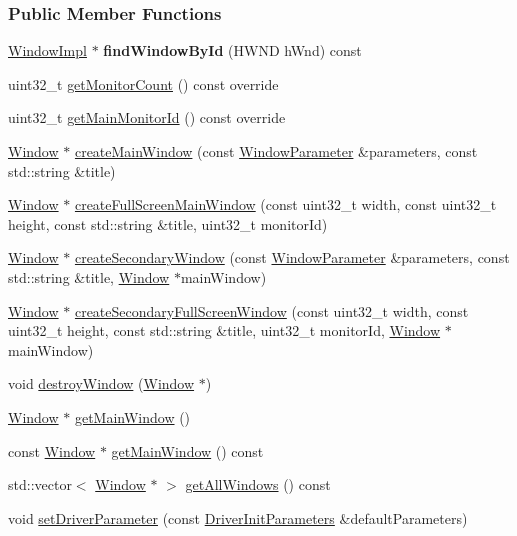 \subsubsection*{Public Member Functions}
\begin{DoxyCompactItemize}
\item 
\hyperlink{a00086}{Window\+Impl} $\ast$ {\bfseries find\+Window\+By\+Id} (H\+W\+ND h\+Wnd) const \hypertarget{a00088_a5c540372abdb0267e6a744275c0dc70c}{}\label{a00088_a5c540372abdb0267e6a744275c0dc70c}

\item 
uint32\+\_\+t \hyperlink{a00088_afa93bde2dfc7d722c236f2a2c51b45af}{get\+Monitor\+Count} () const  override
\item 
uint32\+\_\+t \hyperlink{a00088_a549d762ba32d525e574c06d8bb103255}{get\+Main\+Monitor\+Id} () const  override
\item 
\hyperlink{a00082}{Window} $\ast$ \hyperlink{a00087_a863ac648c2c2a93a57c4a898fb176718}{create\+Main\+Window} (const \hyperlink{a00091}{Window\+Parameter} \&parameters, const std\+::string \&title)
\item 
\hyperlink{a00082}{Window} $\ast$ \hyperlink{a00087_a9c2adc3003612cafb99fd7a156bc9655}{create\+Full\+Screen\+Main\+Window} (const uint32\+\_\+t width, const uint32\+\_\+t height, const std\+::string \&title, uint32\+\_\+t monitor\+Id)
\item 
\hyperlink{a00082}{Window} $\ast$ \hyperlink{a00087_afc8f953d7aa1e2822b8ced1e5b855ab8}{create\+Secondary\+Window} (const \hyperlink{a00091}{Window\+Parameter} \&parameters, const std\+::string \&title, \hyperlink{a00082}{Window} $\ast$main\+Window)
\item 
\hyperlink{a00082}{Window} $\ast$ \hyperlink{a00087_a8d3b6392e5389e7e5706f92ceed96fa0}{create\+Secondary\+Full\+Screen\+Window} (const uint32\+\_\+t width, const uint32\+\_\+t height, const std\+::string \&title, uint32\+\_\+t monitor\+Id, \hyperlink{a00082}{Window} $\ast$main\+Window)
\item 
void \hyperlink{a00087_aecfb9aa6471ecf82e5c76a96440c275c}{destroy\+Window} (\hyperlink{a00082}{Window} $\ast$)
\item 
\hyperlink{a00082}{Window} $\ast$ \hyperlink{a00087_a7ccb3265cab90117a4face1c5ebb5e29}{get\+Main\+Window} ()
\item 
const \hyperlink{a00082}{Window} $\ast$ \hyperlink{a00087_aa59c328988c32399328f8f38c5210275}{get\+Main\+Window} () const 
\item 
std\+::vector$<$ \hyperlink{a00082}{Window} $\ast$ $>$ \hyperlink{a00087_a9aac4dcdd92008cd8602b7456be6260a}{get\+All\+Windows} () const 
\item 
void \hyperlink{a00087_a9aaa765ab360c7093dd1f1d3f5f3d621}{set\+Driver\+Parameter} (const \hyperlink{a00028}{Driver\+Init\+Parameters} \&default\+Parameters)
\end{DoxyCompactItemize}
